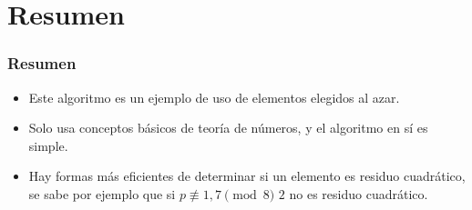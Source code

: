 \documentclass[english, spanish, fleqn,%
hyperref = {colorlinks, urlcolor = blue}%
]{beamer}
\begin{document}
\section{Resumen}

\begin{frame}
  \setcounter{beamerpauses}{2}
  \frametitle{Resumen}

  \begin{itemize}
  \item
    Este algoritmo es un ejemplo de uso de elementos elegidos al azar.
  \item
    Solo usa conceptos básicos de teoría de números,
    y el algoritmo en sí es simple.
  \item
    Hay formas más eficientes
    de determinar si un elemento es residuo cuadrático,
    se sabe por ejemplo que si \(p \not\equiv 1, 7 \pmod{8}\)
    \(2\) no es residuo cuadrático.
  \end{itemize}
\end{frame}
\end{document}

